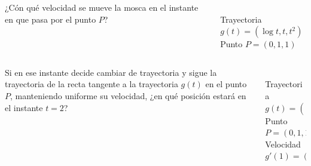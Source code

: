 \documentclass[aspectratio=149,10pt,xcolor=dvipsnames,t]{beamer}
\begin{document}
\begin{frame}
\begin{columns}
\begin{column}[T]{0.65\textwidth}
¿Cón qué velocidad se mueve la mosca en el instante en que pasa por el punto $P$?
\end{column}
\begin{column}[T]{0.35\textwidth}
\\
Trayectoria $g(t)=(\log t, t, t^2)$\\
Punto $P=(0,1,1)$
\end{column}
\end{columns}
\end{frame}


\begin{frame}
\begin{columns}
\begin{column}[T]{0.65\textwidth}
Si en ese instante decide cambiar de trayectoria y sigue la trayectoria de la recta tangente a la trayectoria $g(t)$ en el punto $P$, manteniendo uniforme su velocidad, ¿en qué posición estará en el instante $t=2$?
\end{column}
\begin{column}[T]{0.35\textwidth}
\\
Trayectoria $g(t)=(\log t, t, t^2)$\\
Punto $P=(0,1,1)$\\
Velocidad $g'(1)=(1,1,2)$
\end{column}
\end{columns}
\end{frame}
\end{document}
